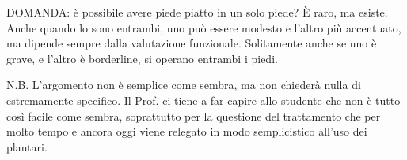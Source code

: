 DOMANDA: è possibile avere piede piatto in un solo piede? È raro, ma esiste. Anche quando lo sono entrambi, uno può essere modesto e l'altro più accentuato, ma dipende sempre dalla valutazione funzionale.
Solitamente anche se uno è grave, e l'altro è borderline, si operano entrambi i piedi.

N.B. L'argomento non è semplice come sembra, ma non chiederà nulla di estremamente specifico. Il Prof. ci tiene a far capire allo studente che non è tutto così facile come sembra, soprattutto per la questione del
trattamento che per molto tempo e ancora oggi viene relegato in modo semplicistico all'uso dei plantari.
